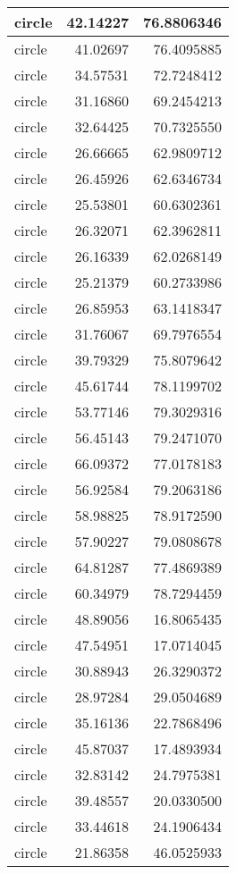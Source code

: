 \documentclass[
]{book}
\theoremstyle{definition}
\theoremstyle{definition}
\theoremstyle{definition}
\theoremstyle{definition}
\theoremstyle{remark}
\begin{document}
\begin{tabular}{l|r|r}
\hline
circle & 42.14227 & 76.8806346\\
\hline
circle & 41.02697 & 76.4095885\\
\hline
circle & 34.57531 & 72.7248412\\
\hline
circle & 31.16860 & 69.2454213\\
\hline
circle & 32.64425 & 70.7325550\\
\hline
circle & 26.66665 & 62.9809712\\
\hline
circle & 26.45926 & 62.6346734\\
\hline
circle & 25.53801 & 60.6302361\\
\hline
circle & 26.32071 & 62.3962811\\
\hline
circle & 26.16339 & 62.0268149\\
\hline
circle & 25.21379 & 60.2733986\\
\hline
circle & 26.85953 & 63.1418347\\
\hline
circle & 31.76067 & 69.7976554\\
\hline
circle & 39.79329 & 75.8079642\\
\hline
circle & 45.61744 & 78.1199702\\
\hline
circle & 53.77146 & 79.3029316\\
\hline
circle & 56.45143 & 79.2471070\\
\hline
circle & 66.09372 & 77.0178183\\
\hline
circle & 56.92584 & 79.2063186\\
\hline
circle & 58.98825 & 78.9172590\\
\hline
circle & 57.90227 & 79.0808678\\
\hline
circle & 64.81287 & 77.4869389\\
\hline
circle & 60.34979 & 78.7294459\\
\hline
circle & 48.89056 & 16.8065435\\
\hline
circle & 47.54951 & 17.0714045\\
\hline
circle & 30.88943 & 26.3290372\\
\hline
circle & 28.97284 & 29.0504689\\
\hline
circle & 35.16136 & 22.7868496\\
\hline
circle & 45.87037 & 17.4893934\\
\hline
circle & 32.83142 & 24.7975381\\
\hline
circle & 39.48557 & 20.0330500\\
\hline
circle & 33.44618 & 24.1906434\\
\hline
circle & 21.86358 & 46.0525933\\

\end{tabular}
\end{document}
